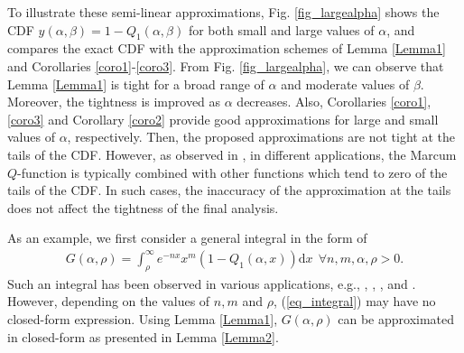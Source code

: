 To illustrate these semi-linear approximations, Fig. \ref{fig_largealpha} shows the CDF $y(\alpha,\beta)= 1-Q_1(\alpha,\beta)$ for both small and large values of $\alpha$, and compares the exact CDF with the approximation schemes of Lemma \ref{Lemma1} and Corollaries \ref{coro1}-\ref{coro3}. From Fig. \ref{fig_largealpha}, we can observe that Lemma \ref{Lemma1} is tight for a broad range of $\alpha$  and moderate values of $\beta$. Moreover, the tightness is improved as $\alpha$ decreases. Also,  Corollaries \ref{coro1}, \ref{coro3} and Corollary \ref{coro2} provide good approximations for large and small values of $\alpha$, respectively. Then, the proposed approximations are not tight at the tails of the CDF. However, as observed in \cite{Bocus2013CLapproximation,helstrom1994elements,Makki2013TCfeedback,Makki2011Eurasipcapacity,Makki2018WCLwireless,Makki2016TVTperformance,Simon2003TWCsome,Suraweera2010TVTcapacity,Kang2003JSAClargest,Chen2004TCdistribution,Ma2000JSACunified,Zhang2002TCgeneral,Ghasemi2008ICMspectrum,Digham2007TCenergy, simon2002bookdigital,Fu2011GLOBECOMexponential,zhao2008ELtight,Simon2000TCexponential,Cao2016CLsolutions,sofotasios2015solutions,Cui2012ELtwo,annamalai2001WCMCcauchy,Sofotasios2010ISWCSnovel,Li2010TCnew,andras2011Mathematicageneralized,Gaur2003TVTsome,Kam2008TCcomputing,Corazza2002TITnew,Baricz2009TITnew,chiani1999ELintegral}, in different applications, the Marcum $Q$-function is typically combined with other functions which tend to zero of the tails of the CDF. In such cases, the inaccuracy of the approximation at the tails does not affect the tightness of the final analysis. 













As an example, we first consider a general integral in the form of
\begin{align}\label{eq_integral}
G(\alpha,\rho)=\int_\rho^\infty{e^{-nx} x^m \left(1-Q_1(\alpha,x)\right)\text{d}x} ~~\forall n,m,\alpha,\rho>0.
\end{align}
Such an integral has been observed in various applications, e.g., \cite[eq. (1)]{Simon2003TWCsome}\cite[eq. (2)]{Cao2016CLsolutions}, \cite[eq. (1)]{sofotasios2015solutions}, \cite[eq. (3)]{Cui2012ELtwo}, and \cite[eq. (1)]{Gaur2003TVTsome}. However, depending on the values of $n, m$ and $\rho$, (\ref{eq_integral}) may have no closed-form expression. Using Lemma \ref{Lemma1}, $G(\alpha,\rho)$ can be approximated in closed-form as presented in Lemma \ref{Lemma2}.

